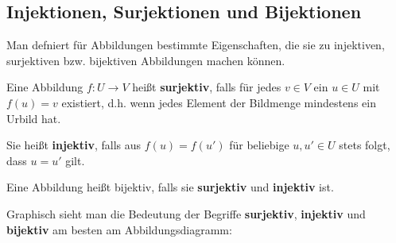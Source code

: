 \documentclass[../../main.tex]{subfiles}
\begin{document}
\subsection*{Injektionen, Surjektionen und Bijektionen}
\pagecolor{violet!20}
\label{advanced:bijektion}
Man defniert für Abbildungen bestimmte Eigenschaften, die sie zu injektiven, surjektiven bzw. bijektiven Abbildungen machen können.

\begin{definition}{}
    Eine Abbildung $f\colon U\rightarrow V$ heißt \textbf{surjektiv}, falls für jedes $v\in V$ ein $u\in U$ mit $f(u)=v$ existiert, d.h. wenn jedes Element der Bildmenge mindestens ein Urbild hat.
    
    Sie heißt \textbf{injektiv}, falls aus $f(u)=f(u')$ für beliebige $u,u'\in U$ stets folgt, dass $u=u'$ gilt. 
    
    Eine Abbildung heißt bijektiv, falls sie \textbf{surjektiv} und \textbf{injektiv} ist.
\end{definition}

Graphisch sieht man die Bedeutung der Begriffe \textbf{surjektiv}, \textbf{injektiv} und \textbf{bijektiv} am besten am Abbildungsdiagramm:
    
\begin{multicols}{3}\centering
    
    
    
\end{multicols}
\end{document}
